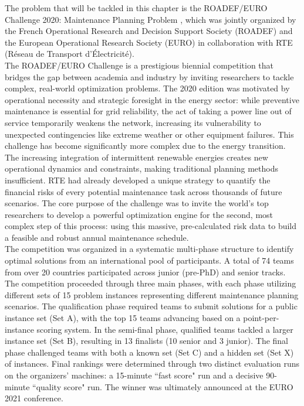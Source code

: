 The problem that will be tackled in this chapter is the ROADEF/EURO Challenge 2020: Maintenance Planning Problem \cite{roadef2020}, which was jointly organized by the French Operational Research and Decision Support Society (ROADEF) and the European Operational Research Society (EURO) in collaboration with RTE (Réseau de Transport d'Électricité).\\

The ROADEF/EURO Challenge is a prestigious biennial competition that bridges the gap between academia and industry by inviting researchers to tackle complex, real-world optimization problems. The 2020 edition was motivated by operational necessity and strategic foresight in the energy sector: while preventive maintenance is essential for grid reliability, the act of taking a power line out of service temporarily weakens the network, increasing its vulnerability to unexpected contingencies like extreme weather or other equipment failures. This challenge has become significantly more complex due to the energy transition. The increasing integration of intermittent renewable energies creates new operational dynamics and constraints, making traditional planning methods insufficient. RTE had already developed a unique strategy to quantify the financial risks of every potential maintenance task across thousands of future scenarios. The core purpose of the challenge was to invite the world's top researchers to develop a powerful optimization engine for the second, most complex step of this process: using this massive, pre-calculated risk data to build a feasible and robust annual maintenance schedule.\\

The competition was organized in a systematic multi-phase structure to identify optimal solutions from an international pool of participants. A total of 74 teams from over 20 countries participated across junior (pre-PhD) and senior tracks. The competition proceeded through three main phases, with each phase utilizing different sets of 15 problem instances representing different maintenance planning scenarios. The qualification phase required teams to submit solutions for a public instance set (Set A), with the top 15 teams advancing based on a point-per-instance scoring system. In the semi-final phase, qualified teams tackled a larger instance set (Set B), resulting in 13 finalists (10 senior and 3 junior). The final phase challenged teams with both a known set (Set C) and a hidden set (Set X) of instances. Final rankings were determined through two distinct evaluation runs on the organizers' machines: a 15-minute ``fast score" run and a decisive 90-minute ``quality score" run. The winner was ultimately announced at the EURO 2021 conference. \\


